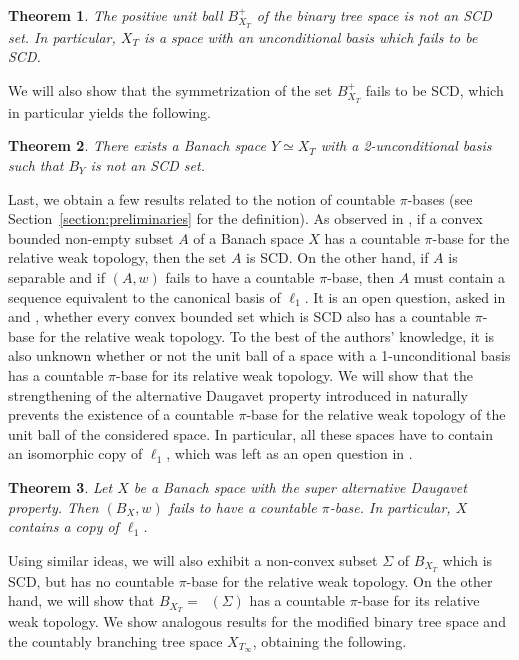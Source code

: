 \documentclass[11pt,a4paper,reqno]{amsart}
\numberwithin{equation}{section}
\DeclareMathOperator{\cconv}{\overline{conv}}
\newcommand{\1}{\mathbbm{1}}
\theoremstyle{plain}
\newtheorem{theorem}{Theorem}[section]
\theoremstyle{definition}
\begin{document}
\begin{theorem}\label{intro_theorem:the_binary_tree_space_is_not_SCD}
    The positive unit ball $B_{X_T}^+$ of the binary tree space is not an SCD set. In particular, $X_T$ is a space with an unconditional basis which fails to be SCD.
\end{theorem}

We will also show that the symmetrization of the set $B_{X_T}^+$ fails to be SCD, which in particular yields the following.

\begin{theorem}\label{intro_theorem:a_Banach_space_with_2-unconditional_basis_whose_unit_ball_is_not_SCD}
    There exists a Banach space $Y\simeq X_T$ with a 2-unconditional basis such that $B_Y$ is not an SCD set.
\end{theorem}

Last, we obtain a few results related to the notion of countable $\pi$-bases (see Section~\ref{section:preliminaries} for the definition). As observed in \cite{AKMMS10}, if a convex bounded non-empty subset $A$ of a Banach space $X$ has a countable $\pi$-base for the relative weak topology, then the set $A$ is SCD. On the other hand, if $A$ is separable and if $(A,w)$ fails to have a countable $\pi$-base, then $A$ must contain a sequence equivalent to the canonical basis of $\ell_1$. It is an open question, asked in \cite{AKMMS10} and \cite{KPW18}, whether every convex bounded set which is SCD also has a countable $\pi$-base for the relative weak topology. To the best of the authors' knowledge, it is also unknown whether or not the unit ball of a space with a 1-unconditional basis has a countable $\pi$-base for its relative weak topology. We will show that the strengthening of the alternative Daugavet property introduced in \cite{LLMRZP25} naturally prevents the existence of a countable $\pi$-base for the relative weak topology of the unit ball of the considered space. In particular, all these spaces have to contain an isomorphic copy of $\ell_1$, which was left as an open question in \cite{LLMRZP25}. 

\begin{theorem}\label{intro_theorem:super_ADP_and_countable_pi-base}
    Let $X$ be a Banach space with the super alternative Daugavet property. Then $(B_X,w)$ fails to have a countable $\pi$-base. In particular, $X$ contains a copy of $\ell_1$. 
\end{theorem}

Using similar ideas, we will also exhibit a non-convex subset $\Sigma$ of $B_{X_T}$ which is SCD, but has no countable $\pi$-base for the relative weak topology. On the other hand, we will show that $B_{X_T}=\cconv(\Sigma)$ has a countable $\pi$-base for its relative weak topology. We show analogous results for the modified binary tree space and the countably branching tree space $X_{T_\infty}$, obtaining the following. 
\end{document}
